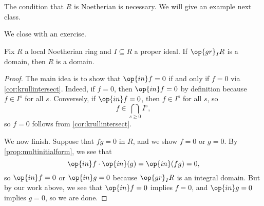 \begin{remark}
	The condition that $R$ is Noetherian is necessary. We will give an example next class.
\end{remark}
We close with an exercise.
\begin{exe}
	Fix $R$ a local Noetherian ring and $I\subseteq R$ a proper ideal. If $\op{gr}_IR$ is a domain, then $R$ is a domain.
\end{exe}
\begin{proof}
	The main idea is to show that $\op{in}f=0$ if and only if $f=0$ via \autoref{cor:krullintersect}. Indeed, if $f=0$, then $\op{in}f=0$ by definition because $f\in I^s$ for all $s$. Conversely, if $\op{in}f=0$, then $f\in I^s$ for all $s$, so
	\[f\in\bigcap_{s\ge0}I^s,\]
	so $f=0$ follows from \autoref{cor:krullintersect}.

	We now finish. Suppose that $fg=0$ in $R$, and we show $f=0$ or $g=0$. By \autoref{prop:multinitialform}, we see that
	\[\op{in}f\cdot\op{in}(g)=\op{in}(fg)=0,\]
	so $\op{in}f=0$ or $\op{in}g=0$ because $\op{gr}_IR$ is an integral domain. But by our work above, we see that $\op{in}f=0$ implies $f=0$, and $\op{in}g=0$ implies $g=0$, so we are done.
\end{proof}